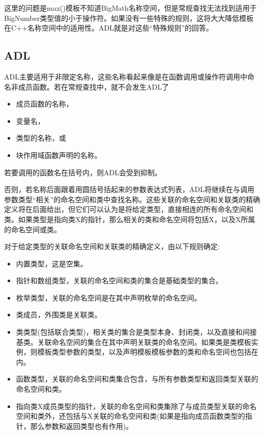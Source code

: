 这里的问题是max()模板不知道BigMath名称空间，但是常规查找无法找到适用于BigNumber类型值的小于操作符。如果没有一些特殊的规则，这将大大降低模板在C++名称空间中的适用性。ADL就是对这些“特殊规则”的回答。

\subsection{ADL}


ADL主要适用于非限定名称，这些名称看起来像是在函数调用或操作符调用中命名非成员函数。若在常规查找中，就不会发生ADL了

\begin{itemize}
\item 
成员函数的名称，

\item 
变量名，

\item 
类型的名称，或

\item 
块作用域函数声明的名称。
\end{itemize}

若要调用的函数名在括号内，则ADL会受到抑制。

否则，若名称后面跟着用圆括号括起来的参数表达式列表，ADL将继续在与调用参数类型“相关”的命名空间和类中查找名称。这些关联的命名空间和关联类的精确定义将在后面给出，但它们可以认为是将给定类型，直接相连的所有命名空间和类。如果类型是指向类X的指针，那么相关的类和命名空间将包括X，以及X所属的命名空间或类。

对于给定类型的关联命名空间和关联类的精确定义，由以下规则确定:

\begin{itemize}
\item 
内置类型，这是空集。

\item 
指针和数组类型，关联的命名空间和类的集合是基础类型的集合。

\item 
枚举类型，关联的命名空间是在其中声明枚举的命名空间。

\item 
类成员，外围类是关联类。

\item 
类类型(包括联合类型)，相关类的集合是类型本身、封闭类，以及直接和间接基类。关联命名空间的集合在其中声明关联类的命名空间。如果类是类模板实例，则模板类型参数的类型，以及声明模板模板参数的类和命名空间也包括在内。

\item 
函数类型，关联的命名空间和类集合包含，与所有参数类型和返回类型关联的命名空间和类。

\item 
指向类X成员类型的指针，关联的命名空间和类集除了与成员类型关联的命名空间和类外，还包括与X关联的命名空间和类(如果是指向成员函数类型的指针，那么参数和返回类型也有作用)。
\end{itemize}

